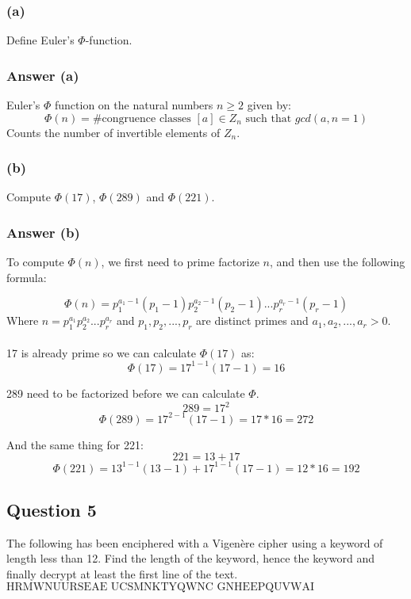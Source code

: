 \documentclass{article}
\begin{document}
	\subsubsection*{(a)}
	Define Euler’s $\Phi$-function.
	
	\subsubsection*{Answer (a)}
	Euler's $\Phi$ function on the natural numbers $n \geq 2$ given by:
	$$
	\Phi(n) =  \text{\# congruence classes } [a] \in Z_n \text{ such that }gcd(a,n = 1)
	$$
	Counts the number of invertible elements of $Z_n$. 
	
	\subsubsection*{(b)}
	Compute $\Phi(17)$, $\Phi(289)$ and $\Phi(221)$.
	
	\subsubsection*{Answer (b)}
	To compute $\Phi(n)$, we first need to prime factorize $n$, and then use the following formula:

	$$
	\Phi(n) = p_{1}^{a_1-1}(p_1-1)p_{2}^{a_2-1}(p_2-1)...p_{r}^{a_r-1}(p_r-1)
	$$
	Where $n = p_{1}^{a_1}p_{2}^{a_2}...p_{r}^{a_r}$ and $p_1,p_2,...,p_r$ are distinct primes and $a_1,a_2,...,a_r > 0$. 
	\\\\
	17 is already prime so we can calculate $\Phi(17)$ as:
	$$
	\Phi(17) = 17^{1-1}(17-1) = 16
	$$

	289 need to be factorized before we can calculate $\Phi$.
	$$
	289 = 17^2
	$$
	$$
	\Phi(289) = 17^{2-1}(17-1) 
	= 17*16 
	= 272
	$$
	
	And the same thing for 221:
	$$
	221 = 13 + 17
	$$
	$$
	\Phi(221) = 13^{1-1}(13-1) + 17^{1-1}(17-1) = 12*16 = 192
	$$
	
	\subsection*{Question 5}
	The following has been enciphered with a Vigenère cipher using a keyword of length less than 12. Find the length of the keyword, hence the keyword and finally decrypt at least the first line of the text.
	$$
	\text{HRMWNUURSEAE UCSMNKTYQWNC GNHEEPQUVWAI UIGGMVVOFMRP EAIKAIPOXLOG}
	$$
\end{document}

